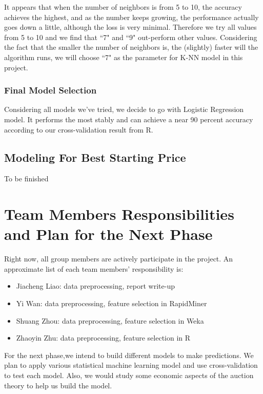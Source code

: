 \documentclass[CEJM,PDF]{cej} %
\begin{document}
It appears that when the number of neighbors is from 5 to 10, the accuracy achieves the highest, and as the number keeps growing, the performance actually goes down a little, although the loss is very minimal. Therefore we try all values from 5 to 10 and we find that ``7" and ``9" out-perform other values. Considering the fact that the smaller the number of neighbors is, the (slightly) faster will the algorithm runs, we will choose ``7" as the parameter for K-NN model in this project.\\

\subsubsection{Final Model Selection}
Considering all models we've tried, we decide to go with Logistic Regression model. It performs the most stably and can achieve a near 90 percent accuracy according to our cross-validation result from R.

\subsection{Modeling For Best Starting Price}
To be finished


\section{Team Members Responsibilities and Plan for the Next Phase}

Right now, all group members are actively participate in the project. An approximate list of each team members' responsibility is:
\begin{itemize}
\item Jiacheng Liao: data preprocessing, report write-up
\item Yi Wan: data preprocessing, feature selection in RapidMiner
\item Shuang Zhou: data preprocessing, feature selection in Weka
\item Zhaoyin Zhu: data preprocessing, feature selection in R
\end{itemize}

For the next phase,we intend to build different models to make predictions. We plan to apply various statistical machine learning model and use cross-validation to test each model. Also, we would study some economic aspects of the auction theory to help us build the model.
\end{document}
